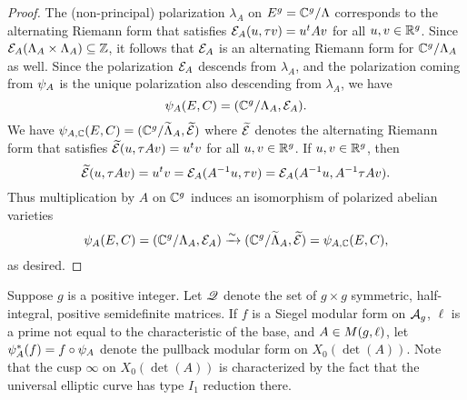 \documentclass{amsart}
\begin{document}
\begin{proof}
The (non-principal) polarization $\lambda_A$ on $E^g = \mathbb{C}^g/\Lambda$ corresponds to the alternating Riemann form that satisfies $\mathcal{E}_A(u,\tau v) = u^tAv$ for all $u,v \in \mathbb{R}^g$. Since $\mathcal{E}_A(\Lambda_A \times \Lambda_A) \subseteq \mathbb{Z}$, it follows that $\mathcal{E}_A$ is an alternating Riemann form for $\mathbb{C}^g/\Lambda_A$ as well. 
Since the polarization $\mathcal{E}_A$ descends from $\lambda_A$, and the polarization coming from $\psi_{A}$ is the unique polarization also descending from $\lambda_A$, we have
\[
  \psi_{A}(E,C) = (\mathbb{C}^g/\Lambda_A, \mathcal{E}_A).
\]
We have ${\psi}_{A, \mathbb{C}}(E,C) = (\mathbb{C}^g/\widetilde{\Lambda}_A, \widetilde{\mathcal{E}})$ where
 $\widetilde{\mathcal{E}}$ denotes the %
alternating Riemann form %
that satisfies %
$\widetilde{\mathcal{E}}(u, \tau A v) = u^tv$ for all $u,v \in \mathbb{R}^g$. If $u, v \in \mathbb{R}^g$, then
$$  \widetilde{\mathcal{E}}(u, \tau A v) = u^tv 
                          = \mathcal{E}_A(A^{-1}u, \tau v) 
                          = \mathcal{E}_{A}(A^{-1}u, A^{-1}\tau Av).$$
Thus multiplication by $A$ on $\mathbb{C}^g$ induces an isomorphism of polarized abelian varieties
\[
  \psi_{A}(E,C) = (\mathbb{C}^g/\Lambda_A, \mathcal{E}_A) \xrightarrow{\sim} (\mathbb{C}^g/\widetilde{\Lambda}_A, \widetilde{\mathcal{E}}) = {\psi}_{A, \mathbb{C}}(E,C),
\]
as desired.
\end{proof}

Suppose $g$ is a positive integer.
   Let $\mathscr{Q}$ denote the set of $g \times g$ symmetric, half-integral, positive semidefinite matrices. 
   If $f$ is a Siegel modular form on $\mathcal{A}_g$, $\ell$ is a prime not equal to the characteristic of the base, and $A\in M(g,\ell)$, let $\psi_{A}^*(f) = f \circ \psi_{A}$ denote the pullback modular form on $X_0(\det(A))$.
     Note that the cusp $\infty$ on $X_0(\det(A))$ is characterized by the fact that the universal elliptic curve has type $I_1$ reduction there.
\end{document}
